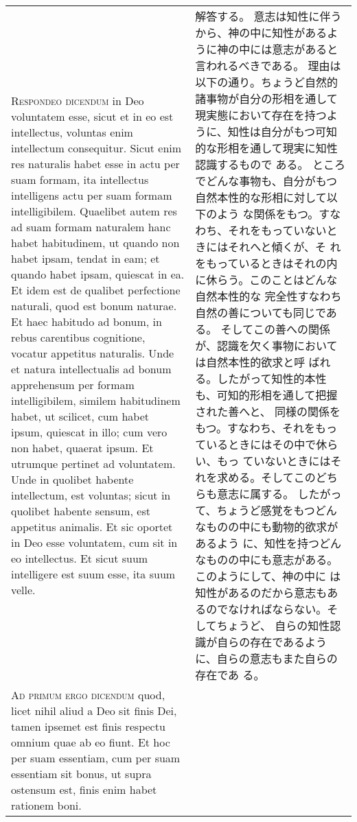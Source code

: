 \documentclass[10pt]{jsarticle} %
\begin{document}
\begin{longtable}{p{21em}p{21em}}
{\scshape Respondeo dicendum} in Deo voluntatem esse,
sicut et in eo est intellectus, voluntas enim intellectum
consequitur. Sicut enim res naturalis habet esse in actu per suam
formam, ita intellectus intelligens actu per suam formam
intelligibilem. Quaelibet autem res ad suam formam naturalem hanc habet
habitudinem, ut quando non habet ipsam, tendat in eam; et quando habet
ipsam, quiescat in ea. Et idem est de qualibet perfectione naturali,
quod est bonum naturae. Et haec habitudo ad bonum, in rebus carentibus
cognitione, vocatur appetitus naturalis. Unde et natura intellectualis
ad bonum apprehensum per formam intelligibilem, similem habitudinem
habet, ut scilicet, cum habet ipsum, quiescat in illo; cum vero non
habet, quaerat ipsum. Et utrumque pertinet ad voluntatem. Unde in
quolibet habente intellectum, est voluntas; sicut in quolibet habente
sensum, est appetitus animalis. Et sic oportet in Deo esse voluntatem,
cum sit in eo intellectus. Et sicut suum intelligere est suum esse, ita
suum velle.

&

解答する。
意志は知性に伴うから、神の中に知性があるように神の中には意志があると言われるべきである。
理由は以下の通り。ちょうど自然的諸事物が自分の形相を通して現実態において存在を持つよ
 うに、知性は自分がもつ可知的な形相を通して現実に知性認識するもので
 ある。
 ところでどんな事物も、自分がもつ自然本性的な形相に対して以下のよう
 な関係をもつ。すなわち、それをもっていないときにはそれへと傾くが、そ
 れをもっているときはそれの内に休らう。このことはどんな自然本性的な
 完全性すなわち自然の善についても同じである。
 そしてこの善への関係が、認識を欠く事物においては自然本性的欲求と呼
 ばれる。したがって知性的本性も、可知的形相を通して把握された善へと、
 同様の関係をもつ。すなわち、それをもっているときにはその中で休らい、もっ
 ていないときにはそれを求める。そしてこのどちらも意志に属する。
 したがって、ちょうど感覚をもつどんなものの中にも動物的欲求があるよう
 に、知性を持つどんなものの中にも意志がある。このようにして、神の中に
 は知性があるのだから意志もあるのでなければならない。そしてちょうど、
 自らの知性認識が自らの存在であるように、自らの意志もまた自らの存在であ
 る。

\\


{\scshape Ad primum ergo dicendum} quod, licet nihil
aliud a Deo sit finis Dei, tamen ipsemet est finis respectu omnium quae
ab eo fiunt. Et hoc per suam essentiam, cum per suam essentiam sit
bonus, ut supra ostensum est, finis enim habet rationem boni.

&


\end{longtable}
\end{document}
